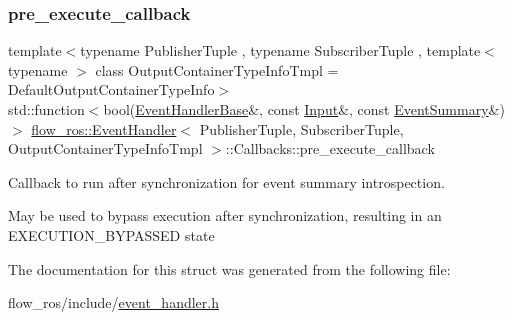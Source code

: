 \subsubsection{\texorpdfstring{pre\+\_\+execute\+\_\+callback}{pre\_execute\_callback}}
{\footnotesize\ttfamily template$<$typename Publisher\+Tuple , typename Subscriber\+Tuple , template$<$ typename $>$ class Output\+Container\+Type\+Info\+Tmpl = Default\+Output\+Container\+Type\+Info$>$ \\
std\+::function$<$bool(\hyperlink{classflow__ros_1_1_event_handler_base}{Event\+Handler\+Base}\&, const \hyperlink{classflow__ros_1_1_event_handler_a53af7756aaf98646281d57b036510d56}{Input}\&, const \hyperlink{structflow__ros_1_1_event_summary}{Event\+Summary}\&)$>$ \hyperlink{classflow__ros_1_1_event_handler}{flow\+\_\+ros\+::\+Event\+Handler}$<$ Publisher\+Tuple, Subscriber\+Tuple, Output\+Container\+Type\+Info\+Tmpl $>$\+::Callbacks\+::pre\+\_\+execute\+\_\+callback}



Callback to run after synchronization for event summary introspection. 

May be used to bypass execution after synchronization, resulting in an E\+X\+E\+C\+U\+T\+I\+O\+N\+\_\+\+B\+Y\+P\+A\+S\+S\+ED state 

The documentation for this struct was generated from the following file\+:\begin{DoxyCompactItemize}
\item 
flow\+\_\+ros/include/\hyperlink{event__handler_8h}{event\+\_\+handler.\+h}\end{DoxyCompactItemize}
